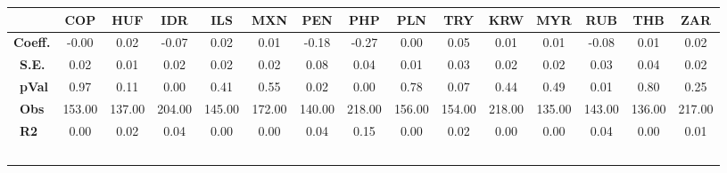\begin{tabular}{l|cccccccccccccc}
\hline
&\textbf{COP}&\textbf{HUF}&\textbf{IDR}&\textbf{ILS}&\textbf{MXN}&\textbf{PEN}&\textbf{PHP}&\textbf{PLN}&\textbf{TRY}&\textbf{KRW}&\textbf{MYR}&\textbf{RUB}&\textbf{THB}&\textbf{ZAR}\\\hline
\textbf{Coeff.}&-0.00&0.02&-0.07&0.02&0.01&-0.18&-0.27&0.00&0.05&0.01&0.01&-0.08&0.01&0.02\\\
\textbf{S.E.}&0.02&0.01&0.02&0.02&0.02&0.08&0.04&0.01&0.03&0.02&0.02&0.03&0.04&0.02\\\
\textbf{pVal}&0.97&0.11&0.00&0.41&0.55&0.02&0.00&0.78&0.07&0.44&0.49&0.01&0.80&0.25\\\
\textbf{Obs}&153.00&137.00&204.00&145.00&172.00&140.00&218.00&156.00&154.00&218.00&135.00&143.00&136.00&217.00\\\
\textbf{R2}&0.00&0.02&0.04&0.00&0.00&0.04&0.15&0.00&0.02&0.00&0.00&0.04&0.00&0.01\\\
\end{tabular}
